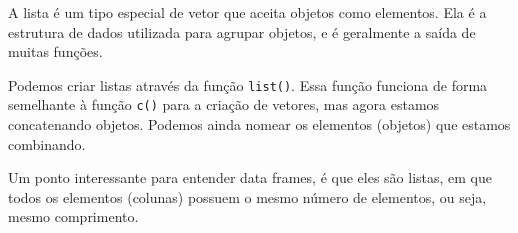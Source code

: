 \documentclass[
]{book}
\newenvironment{Shaded}{\begin{snugshade}}{\end{snugshade}}
\newcommand{\AttributeTok}[1]{\textcolor[rgb]{0.61,0.61,0.61}{#1}}
\newcommand{\CommentTok}[1]{\textcolor[rgb]{0.37,0.37,0.37}{\textit{#1}}}
\newcommand{\DecValTok}[1]{\textcolor[rgb]{0.06,0.06,0.06}{#1}}
\newcommand{\DocumentationTok}[1]{\textcolor[rgb]{0.37,0.37,0.37}{\textbf{\textit{#1}}}}
\newcommand{\FunctionTok}[1]{\textcolor[rgb]{0,0,0}{#1}}
\newcommand{\NormalTok}[1]{#1}
\newcommand{\OtherTok}[1]{\textcolor[rgb]{0.37,0.37,0.37}{#1}}
\begin{document}
A lista é um tipo especial de vetor que aceita objetos como elementos. Ela é a estrutura de dados utilizada para agrupar objetos, e é geralmente a saída de muitas funções.

Podemos criar listas através da função \texttt{list()}. Essa função funciona de forma semelhante à função \texttt{c()} para a criação de vetores, mas agora estamos concatenando objetos. Podemos ainda nomear os elementos (objetos) que estamos combinando.

Um ponto interessante para entender data frames, é que eles são listas, em que todos os elementos (colunas) possuem o mesmo número de elementos, ou seja, mesmo comprimento.

\begin{Shaded}
\end{Shaded}
\end{document}
